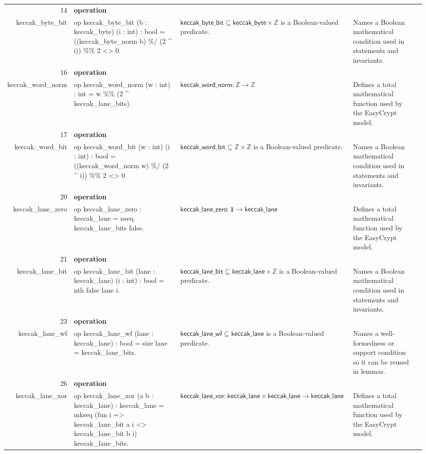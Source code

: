 \documentclass[10pt]{article}
\newcommand{\ec}[1]{\begingroup\ttfamily\scriptsize #1\endgroup}
\begin{document}
\begin{longtable}{r L{0.17\textwidth} L{0.26\textwidth} L{0.27\textwidth} L{0.20\textwidth}}
14 & \textbf{operation}\\\ec{keccak\_byte\_bit} & \ec{op keccak\_byte\_bit (b : keccak\_byte) (i : int) : bool = ((keccak\_byte\_norm b) \%/ (2 \textasciicircum{} i)) \%\% 2 <> 0.} & \(\mathsf{keccak\_byte\_bit} \subseteq \mathsf{keccak\_byte} \times \mathbb{Z}\) is a Boolean-valued predicate. & Names a Boolean mathematical condition used in statements and invariants. \\
16 & \textbf{operation}\\\ec{keccak\_word\_norm} & \ec{op keccak\_word\_norm (w : int) : int = w \%\% (2 \textasciicircum{} keccak\_lane\_bits).} & \(\mathsf{keccak\_word\_norm} : \mathbb{Z} \to \mathbb{Z}\) & Defines a total mathematical function used by the EasyCrypt model. \\
17 & \textbf{operation}\\\ec{keccak\_word\_bit} & \ec{op keccak\_word\_bit (w : int) (i : int) : bool = ((keccak\_word\_norm w) \%/ (2 \textasciicircum{} i)) \%\% 2 <> 0.} & \(\mathsf{keccak\_word\_bit} \subseteq \mathbb{Z} \times \mathbb{Z}\) is a Boolean-valued predicate. & Names a Boolean mathematical condition used in statements and invariants. \\
20 & \textbf{operation}\\\ec{keccak\_lane\_zero} & \ec{op keccak\_lane\_zero : keccak\_lane = nseq keccak\_lane\_bits false.} & \(\mathsf{keccak\_lane\_zero} : \mathbf{1} \to \mathsf{keccak\_lane}\) & Defines a total mathematical function used by the EasyCrypt model. \\
21 & \textbf{operation}\\\ec{keccak\_lane\_bit} & \ec{op keccak\_lane\_bit (lane : keccak\_lane) (i : int) : bool = nth false lane i.} & \(\mathsf{keccak\_lane\_bit} \subseteq \mathsf{keccak\_lane} \times \mathbb{Z}\) is a Boolean-valued predicate. & Names a Boolean mathematical condition used in statements and invariants. \\
23 & \textbf{operation}\\\ec{keccak\_lane\_wf} & \ec{op keccak\_lane\_wf (lane : keccak\_lane) : bool = size lane = keccak\_lane\_bits.} & \(\mathsf{keccak\_lane\_wf} \subseteq \mathsf{keccak\_lane}\) is a Boolean-valued predicate. & Names a well-formedness or support condition so it can be reused in lemmas. \\
26 & \textbf{operation}\\\ec{keccak\_lane\_xor} & \ec{op keccak\_lane\_xor (a b : keccak\_lane) : keccak\_lane = mkseq (fun i => keccak\_lane\_bit a i <> keccak\_lane\_bit b i) keccak\_lane\_bits.} & \(\mathsf{keccak\_lane\_xor} : \mathsf{keccak\_lane} \times \mathsf{keccak\_lane} \to \mathsf{keccak\_lane}\) & Defines a total mathematical function used by the EasyCrypt model. \\

\end{longtable}
\end{document}
